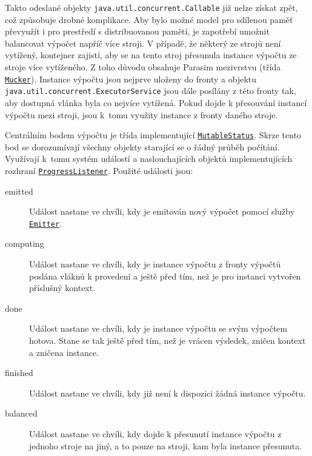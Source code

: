 Takto odeslané objekty \texttt{java.util.concurrent.Callable} již nelze získat zpět,
což způsobuje drobné komplikace. Aby bylo možné model pro sdílenou paměť převyužít i pro prestředí s distribuovanou pamětí,
je zapotřebí u\-mož\-nit balancovat výpočet napříč více stroji. V případě, že některý ze strojů není vytížený, kontejner zajistí,
aby se na tento stroj přesunula instance výpočtu ze stroje více vytíženého. Z toho důvodu
obsahuje Parasim mezivrstvu (třída \href{https://github.com/sybila/parasim/blob/2.0.0.Final/extensions/computation-lifecycle-impl/src/main/java/org/sybila/parasim/computation/lifecycle/impl/common/Mucker.java}{\texttt{Mucker}}). Instance výpočtu jsou nejprve uloženy do fronty a objektu \texttt{java.util.concurrent.ExecutorService}
jsou dále posílány z této fronty tak, aby dostupná vlánka byla co nejvíce vytížená.
Pokud dojde k přesouvání instancí výpočtu mezi stroji, jsou k~tomu využity instance z fronty daného stroje.

Centrálním bodem výpočtu je třída implementující \href{https://github.com/sybila/parasim/blob/2.0.0.Final/extensions/computation-lifecycle-api/src/main/java/org/sybila/parasim/computation/lifecycle/api/MutableStatus.java}{\texttt{MutableStatus}}. Skrze tento bod se dorozumívají všechny objekty
starající se o řádný průběh počítání. Využívají k~tomu systém událostí a naslouchajících objektů
implementujících rozhraní \href{https://github.com/sybila/parasim/blob/2.0.0.Final/extensions/computation-lifecycle-api/src/main/java/org/sybila/parasim/computation/lifecycle/api/ProgressListener.java}{\texttt{ProgressListener}}. Použité události jsou:

\begin{description}

    \item[emitted] 		Událost nastane ve chvíli, kdy je emitován nový výpočet pomocí služby
						\href{https://github.com/sybila/parasim/blob/2.0.0.Final/extensions/computation-lifecycle-api/src/main/java/org/sybila/parasim/computation/lifecycle/api/Emitter.java}{\texttt{Emitter}}.

    \item[computing] 	Událost nastane ve chvíli, kdy je instance výpočtu z fronty vý\-poč\-tů poslána
						vláknů k provedení a ještě před tím, než je pro instanci vytvořen příslušný kontext.

    \item[done] 		Událost nastane ve chvíli, kdy je instance výpočtu se svým výpočtem
						hotova. Stane se tak ještě před tím, než je vrácen výsledek,
						zničen kontext a zničena instance.

	\item[finished]		Událost nastane ve chvíli, kdy již není k dispozici žádná instance výpočtu.
	
	\item[balanced]		Událost nastane ve chvíli, kdy dojde k přesunutí instance výpočtu z jednoho stroje na jiný,
						a to pouze na stroji, kam byla instance pře\-su\-nu\-ta.
\end{description}

